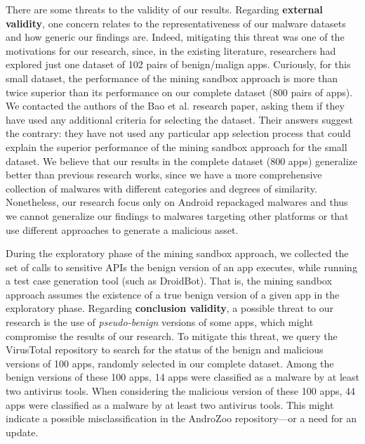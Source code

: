 
There are some threats to the validity of our results.
Regarding {\bf external validity}, one concern relates to the 
representativeness of our malware datasets and how generic our findings are.
Indeed, mitigating this threat was one of the motivations for our research,
since, in the existing literature, researchers had explored just
one dataset of 102 pairs of benign/malign apps. Curiously,
for this small dataset, the performance of the
mining sandbox approach is more than twice superior
than its performance on our complete dataset (800 pairs of
apps). We contacted the authors of the Bao et al. research paper, asking them
if they have used any additional criteria for selecting the
dataset. Their answers suggest the contrary: they have not used
any particular app selection process that
could explain the superior performance of the mining
sandbox approach for the small dataset. We believe that
our results in the complete dataset (800 apps) generalize better than previous research works,
since we have a more comprehensive collection of malwares with different
categories and degrees of similarity. Nonetheless, our
research focus only on Android repackaged malwares and thus we
cannot generalize our findings to malwares targeting
other platforms or that use different approaches to
generate a malicious asset.

During the exploratory phase of the mining sandbox approach,
we collected the set of calls to sensitive APIs the benign version of
an app executes, while running a test case generation tool (such as
DroidBot). That is, the mining sandbox approach assumes the existence of a true benign
version of a given app in the exploratory phase. Regarding {\bf conclusion validity}, a
possible threat to our research is the use of \emph{pseudo-benign} versions
of some apps, which might compromise the results of our research.
To mitigate this threat, we query the VirusTotal repository to search for the
status of the benign and malicious versions of 100 apps,
randomly selected in our complete dataset. Among the benign
versions of these 100 apps, 14 apps were classified as a malware 
by at least two antivirus tools. When considering
the malicious version of these 100 apps, 44 apps were
classified as a malware by at least two antivirus tools. This might indicate
a possible misclassification in the AndroZoo repository---or a need
for an update. 

